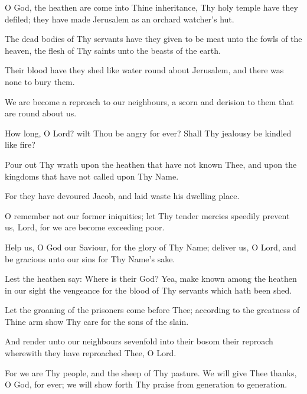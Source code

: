 O God, the heathen are come into Thine inheritance, Thy holy temple have they defiled; they have made Jerusalem as an orchard watcher’s hut.

The dead bodies of Thy servants have they given to be meat unto the fowls of the heaven, the flesh of Thy saints unto the beasts of the earth.

Their blood have they shed like water round about Jerusalem, and there was none to bury them.

We are become a reproach to our neighbours, a scorn and derision to them that are round about us.

How long, O Lord? wilt Thou be angry for ever? Shall Thy jealousy be kindled like fire?

Pour out Thy wrath upon the heathen that have not known Thee, and upon the kingdoms that have not called upon Thy Name.

For they have devoured Jacob, and laid waste his dwelling place.

O remember not our former iniquities; let Thy tender mercies speedily prevent us, Lord, for we are become exceeding poor.

Help us, O God our Saviour, for the glory of Thy Name; deliver us, O Lord, and be gracious unto our sins for Thy Name's sake.

Lest the heathen say: Where is their God? Yea, make known among the heathen in our sight the vengeance for the blood of Thy servants which hath been shed.

Let the groaning of the prisoners come before Thee; according to the greatness of Thine arm show Thy care for the sons of the slain.

And render unto our neighbours sevenfold into their bosom their reproach wherewith they have reproached Thee, O Lord.

For we are Thy people, and the sheep of Thy pasture. We will give Thee thanks, O God, for ever; we will show forth Thy praise from generation to generation.
